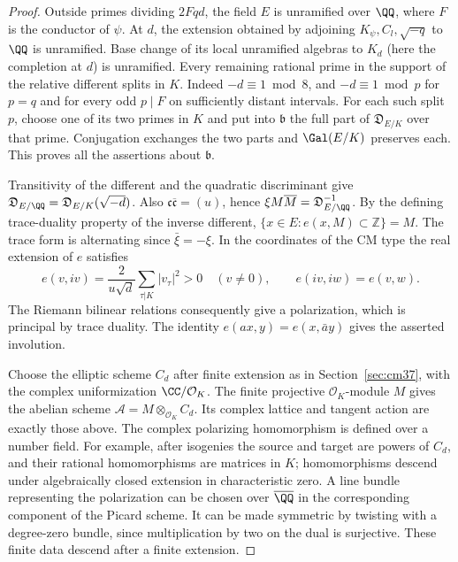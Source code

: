 \documentclass[a4paper,11pt]{article}
\theoremstyle{definition}
\theoremstyle{remark}
\newcommand{\ZZ}{\mathbb Z}\newcommand{\ord}{\operatorname{ord}}
\numberwithin{equation}{section}
\newcommand{\OO}{\mathcal O}
\begin{document}
\begin{proof}
Outside primes dividing \(2Fqd\), the field \(E\) is unramified over
\(\QQ\), where \(F\) is the conductor of \(\psi\). At \(d\), the
extension obtained by adjoining \(K_\psi,C_l,\sqrt{-q}\) to \(\QQ\)
is unramified. Base change of its local unramified algebras to \(K_d\)
(here the completion at \(d\)) is unramified. Every remaining rational
prime in the support of the relative different splits in \(K\).
Indeed \(-d\equiv1\bmod 8\), and \(-d\equiv1\bmod p\) for \(p=q\)
and for every odd \(p\mid F\) on sufficiently distant intervals.
For each such split \(p\), choose one of its two primes in \(K\) and
put into \(\mathfrak b\) the full part of \(\mathfrak D_{E/K}\) over
that prime. Conjugation exchanges the two parts and \(\Gal(E/K)\)
preserves each. This proves all the assertions about \(\mathfrak b\).

Transitivity of the different and the quadratic discriminant give
\(\mathfrak D_{E/\QQ}=\mathfrak D_{E/K}(\sqrt{-d})\).
Also \(\mathfrak c\overline{\mathfrak c}=(u)\), hence
\(\xi M\overline M=\mathfrak D_{E/\QQ}^{-1}\). By the defining
trace-duality property of the inverse different,
\(\{x\in E:e(x,M)\subset\ZZ\}=M\). The trace form is alternating
since \(\bar\xi=-\xi\). In the coordinates of the CM type the real
extension of \(e\) satisfies
\[
 e(v,iv)=\frac{2}{u\sqrt d}\sum_{\tau|K}|v_\tau|^2>0\quad(v\ne0),
 \qquad e(iv,iw)=e(v,w).
\]
The Riemann bilinear relations consequently give a polarization, which
is principal by trace duality. The identity \(e(ax,y)=e(x,\bar a y)\)
gives the asserted involution.~\cite{XIII-X-IV-cm37}

Choose the elliptic scheme \(C_d\) after finite extension as in
Section~\ref{sec:cm37}, with the complex uniformization
\(\CC/\OO_K\). The finite projective \(\OO_K\)-module \(M\) gives
the abelian scheme \(\mathcal A=M\otimes_{\OO_K}C_d\). Its complex
lattice and tangent action are exactly those above. The complex
polarizing homomorphism is defined over a number field. For example,
after isogenies the source and target are powers of \(C_d\), and their
rational homomorphisms are matrices in \(K\); homomorphisms descend
under algebraically closed extension in characteristic zero. A line
bundle representing the polarization can be chosen over
\(\overline{\QQ}\) in the corresponding component of the Picard
scheme. It can be made symmetric by twisting with a degree-zero
bundle, since multiplication by two on the dual is surjective.
These finite data descend after a finite extension.


\end{proof}
\end{document}
